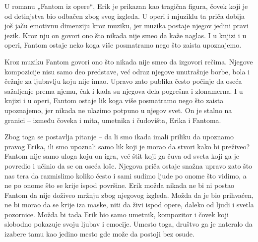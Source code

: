 \documentclass[12pt]{article}
\begin{document}
U romanu „Fantom iz opere“, Erik je prikazan kao tragična figura, čovek koji je od detinjstva bio odbačen zbog svog izgleda. U operi i mjuziklu ta priča dobija još jaču emotivnu dimenziju kroz muziku, jer muzika postaje njegov jedini pravi jezik. Kroz nju on govori ono što nikada nije smeo da kaže naglas. I u knjizi i u operi, Fantom ostaje neko koga više posmatramo nego što zaista upoznajemo.

Kroz muziku Fantom govori ono što nikada nije smeo da izgovori rečima. Njegove kompozicije nisu samo deo predstave, već odraz njegove unutrašnje borbe, bola i čežnje za ljubavlju koju nije imao. Upravo zato publika često počinje da oseća sažaljenje prema njemu, čak i kada su njegova dela pogrešna i zlonamerna. I u knjizi i u operi, Fantom ostaje lik koga više posmatramo nego što zaista upoznajemo, jer nikada ne ulazimo potpuno u njegov svet. On je stalno na granici – između čoveka i mita, umetnika i čudovišta, Erika i Fantoma.

Zbog toga se postavlja pitanje – da li smo ikada imali priliku da upoznamo pravog Erika, ili smo upoznali samo lik koji je morao da stvori kako bi preživeo? Fantom nije samo uloga koju on igra, već štit koji ga čuva od sveta koji ga je povredio i učinio da se on oseća loše. Njegova priča ostaje snažna upravo zato što nas tera da razmislimo koliko često i sami sudimo ljude po onome što vidimo, a ne po onome što se krije ispod površine. Erik možda nikada ne bi ni postao Fantom da nije doživeo mržnju zbog njegovog izgleda. Možda da je bio prihvaćen, ne bi morao da se krije iza maske, niti da živi ispod opere, daleko od ljudi i svetla pozornice. Možda bi tada Erik bio samo umetnik, kompozitor i čovek koji slobodno pokazuje svoju ljubav i emocije. Umesto toga, društvo ga je nateralo da izabere tamu kao jedino mesto gde može da postoji bez osude.
\end{document}
